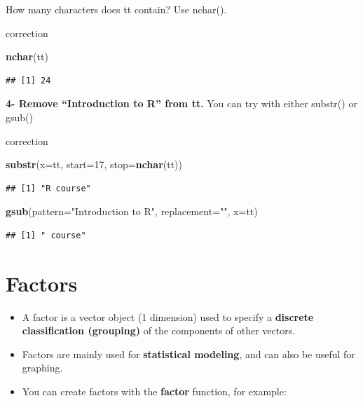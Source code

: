 \documentclass[]{book}
\newenvironment{Shaded}{\begin{snugshade}}{\end{snugshade}}
\newcommand{\DataTypeTok}[1]{\textcolor[rgb]{0.13,0.29,0.53}{#1}}
\newcommand{\DecValTok}[1]{\textcolor[rgb]{0.00,0.00,0.81}{#1}}
\newcommand{\KeywordTok}[1]{\textcolor[rgb]{0.13,0.29,0.53}{\textbf{#1}}}
\newcommand{\NormalTok}[1]{#1}
\newcommand{\StringTok}[1]{\textcolor[rgb]{0.31,0.60,0.02}{#1}}
\begin{document}
How many characters does tt contain? Use nchar().

correction

\begin{Shaded}
\begin{Highlighting}[]
\KeywordTok{nchar}\NormalTok{(tt)}
\end{Highlighting}
\end{Shaded}

\begin{verbatim}
## [1] 24
\end{verbatim}

\textbf{4- Remove ``Introduction to R'' from tt.}
You can try with either substr() or gsub()

correction

\begin{Shaded}
\begin{Highlighting}[]
\KeywordTok{substr}\NormalTok{(}\DataTypeTok{x=}\NormalTok{tt, }\DataTypeTok{start=}\DecValTok{17}\NormalTok{, }\DataTypeTok{stop=}\KeywordTok{nchar}\NormalTok{(tt))}
\end{Highlighting}
\end{Shaded}

\begin{verbatim}
## [1] "R course"
\end{verbatim}

\begin{Shaded}
\begin{Highlighting}[]
\KeywordTok{gsub}\NormalTok{(}\DataTypeTok{pattern=}\StringTok{"Introduction to R"}\NormalTok{, }\DataTypeTok{replacement=}\StringTok{""}\NormalTok{, }\DataTypeTok{x=}\NormalTok{tt)}
\end{Highlighting}
\end{Shaded}

\begin{verbatim}
## [1] " course"
\end{verbatim}

\hypertarget{factors}{%
\section{Factors}\label{factors}}

\begin{itemize}
\item
  A factor is a vector object (1 dimension) used to specify a \textbf{discrete classification (grouping)} of the components of other vectors.
\item
  Factors are mainly used for \textbf{statistical modeling}, and can also be useful for graphing.
\item
  You can create factors with the \textbf{factor} function, for example:
\end{itemize}
\end{document}
